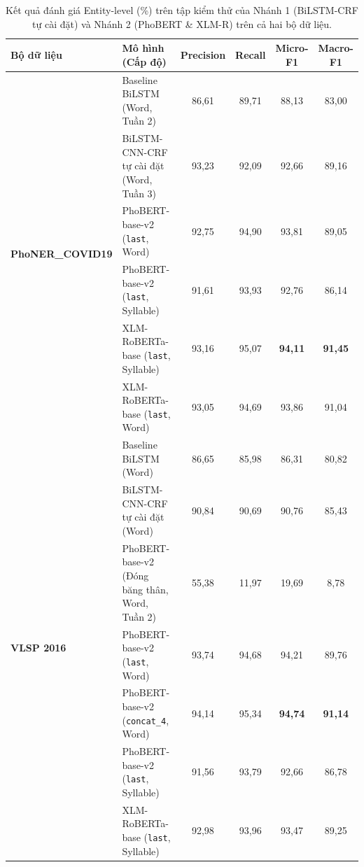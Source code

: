 \begin{table}[t]
\centering
\small
\begin{tabular}{llcccc}
\hline
\textbf{Bộ dữ liệu} & \textbf{Mô hình (Cấp độ)} & \textbf{Precision} & \textbf{Recall} & \textbf{Micro-F1} & \textbf{Macro-F1} \\
\hline
\multirow{6}{*}{\textbf{PhoNER\_COVID19}}
  & Baseline BiLSTM (Word, Tuần 2) & 86,61 & 89,71 & 88,13 & 83,00 \\
  & BiLSTM-CNN-CRF tự cài đặt (Word, Tuần 3) & 93,23 & 92,09 & 92,66 & 89,16 \\
  & PhoBERT-base-v2 (\texttt{last}, Word) & 92,75 & 94,90 & 93,81 & 89,05 \\
  & PhoBERT-base-v2 (\texttt{last}, Syllable) & 91,61 & 93,93 & 92,76 & 86,14 \\
  & XLM-RoBERTa-base (\texttt{last}, Syllable) & 93,16 & 95,07 & \textbf{94,11} & \textbf{91,45} \\
  & XLM-RoBERTa-base (\texttt{last}, Word) & 93,05 & 94,69 & 93,86 & 91,04 \\
\hline
\multirow{7}{*}{\textbf{VLSP 2016}}
  & Baseline BiLSTM (Word) & 86,65 & 85,98 & 86,31 & 80,82 \\
  & BiLSTM-CNN-CRF tự cài đặt (Word) & 90,84 & 90,69 & 90,76 & 85,43 \\
  & PhoBERT-base-v2 (Đóng băng thân, Word, Tuần 2) & 55,38 & 11,97 & 19,69 & 8,78 \\
  & PhoBERT-base-v2 (\texttt{last}, Word) & 93,74 & 94,68 & 94,21 & 89,76 \\
  & PhoBERT-base-v2 (\texttt{concat\_4}, Word) & 94,14 & 95,34 & \textbf{94,74} & \textbf{91,14} \\
  & PhoBERT-base-v2 (\texttt{last}, Syllable) & 91,56 & 93,79 & 92,66 & 86,78 \\
  & XLM-RoBERTa-base (\texttt{last}, Syllable) & 92,98 & 93,96 & 93,47 & 89,25 \\
\hline
\end{tabular}
\caption{Kết quả đánh giá Entity-level (\%) trên tập kiểm thử của Nhánh 1 (BiLSTM-CRF tự cài đặt) và Nhánh 2 (PhoBERT \& XLM-R) trên cả hai bộ dữ liệu.}
\label{tab:milestone-results}
\end{table}

